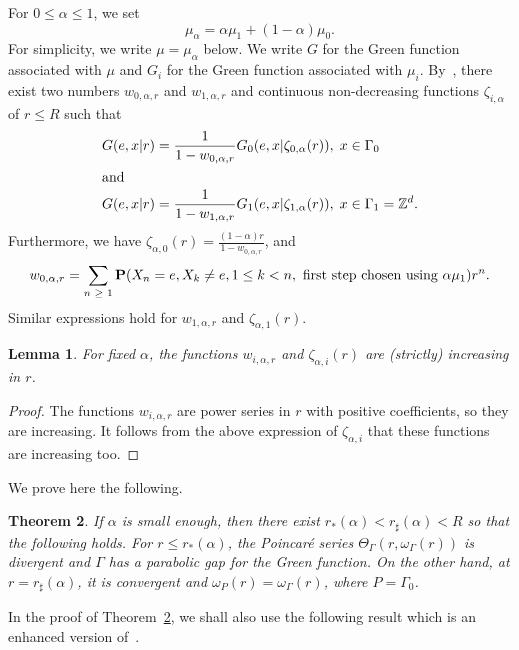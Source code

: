 \documentclass[10pt]{amsart}
\newtheorem{theo}{Theorem}[section]
\newtheorem{lemm}[theo]{Lemma}\newtheorem{prop}[theo]{Proposition}\newtheorem{coro}[theo]{Corollary}\newtheorem{conj}[theo]{Conjecture}
\theoremstyle{definition}\newtheorem{defi}[theo]{Definition}\newtheorem{rema}[theo]{Remark}\newtheorem{exam}[theo]{Example}\newtheorem{exem}[theo]{Example}\newtheorem{nota}[theo]{Notation}
\newcommand{\Z}{\mathbb{Z}}
\newcommand{\bfP}{\mathbf{P}}
\let\originalleft\left
\let\originalright\right
\renewcommand{\left}{\mathopen{}\mathclose\bgroup\originalleft}
\renewcommand{\right}{\aftergroup\egroup\originalright}
\let\oldin\in
\renewcommand{\in}{\mathchoice{\oldin}{\oldin}{\,\oldin\,}{\,\oldin\,}}
\let\oldge\ge
\renewcommand{\ge}{\mathchoice{\oldge}{\oldge}{\,\oldge\,}{\,\oldge\,}}
\begin{document}
For $0\leq \alpha\leq 1$, we set
\[
\mu_\alpha=\alpha \mu_1+(1-\alpha)\mu_0.
\]
For simplicity, we write $\mu=\mu_\alpha$ below. We write $G$ for the Green function associated with $\mu$ and $G_{i}$ for the Green function associated with $\mu_i$. By~\cite[(10), (11)]{DWY}, there exist two numbers $w_{0,\alpha,r}$ and $w_{1,\alpha,r}$ and continuous non-decreasing functions $\zeta_{i,\alpha}$ of $r\leq R$ such that
\begin{align}
G(e,x|r) &=\frac{1}{1-w_{0,\alpha,r}}G_0(e,x|\zeta_{0,\alpha}(r)),
\; x\in \Gamma_0\label{equationG0}\\
\intertext{and}
G(e,x|r)
&=\frac{1}{1-w_{1,\alpha,r}}G_1(e,x|\zeta_{1,\alpha}(r)),
\; x\in \Gamma_1=\Z^d.\label{equationG1}
\end{align}
Furthermore, we have $\zeta_{\alpha, 0}(r) = \frac{(1 - \alpha) r}{1 - w_{0,\alpha,r}}$, and
\begin{equation}\label{wralpha}
w_{0, \alpha,r} = \sum_{n \ge 1} \bfP \left(X_n = e, X_k \neq e, 1 \leq k < n, \text{ first step chosen using } \alpha \mu_1 \right) r^n.
\end{equation}
Similar expressions hold for $w_{1,\alpha,r}$ and $\zeta_{\alpha,1}(r)$.

\begin{lemm}
For fixed $\alpha$, the functions $w_{i,\alpha,r}$ and $\zeta_{\alpha,i}(r)$ are (strictly) increasing in $r$.
\end{lemm}

\begin{proof}
The functions $w_{i,\alpha,r}$ are power series in $r$ with positive coefficients, so they are increasing. It follows from the above expression of $\zeta_{\alpha,i}$ that these functions are increasing too.
\end{proof}



We prove here the following.
\begin{theo}\label{transitionphasePoincare}
If $\alpha$ is small enough, then there exist $r_*(\alpha)<r_\sharp(\alpha) <R$ so that the following holds. For $r\leq r_*(\alpha)$, the Poincaré series $\Theta_{\Gamma}(r,\omega_{\Gamma}(r))$ is divergent and $\Gamma$ has a parabolic gap for the Green function. On the other hand, at $r=r_\sharp(\alpha)$, it is convergent and $\omega_P(r)=\omega_\Gamma(r)$, where $P=\Gamma_0$.
\end{theo}


In the proof of Theorem~\ref{transitionphasePoincare}, we shall also use the following result which is an enhanced version of~\cite[(14)]{DWY}.
\end{document}
